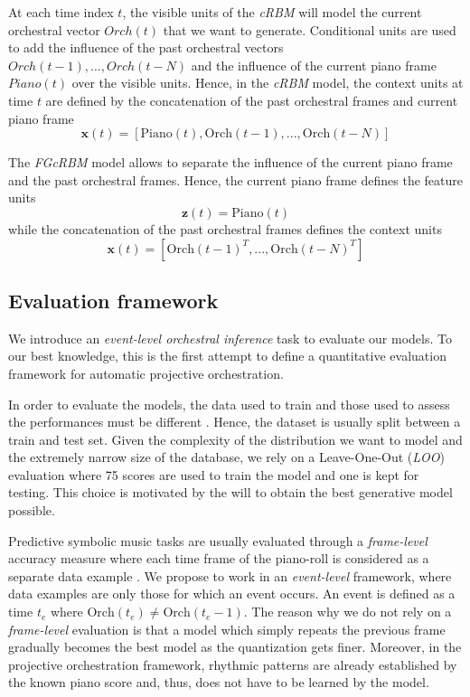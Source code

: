 \documentclass{article}
\begin{document}
At each time index $t$, the visible units of the \textit{cRBM} will model the current orchestral vector $Orch(t)$ that we want to generate. Conditional units are used to add the influence of the past orchestral vectors $Orch(t-1) , ... , Orch(t-N)$ and the influence of the current piano frame $Piano(t)$ over the visible units. Hence, in the \textit{cRBM} model, the context units at time $t$ are defined by the concatenation of the past orchestral frames and current piano frame
\begin{equation}
\bm{x}(t) = \left[ \text{Piano}(t) , \text{Orch}(t-1) , ... , \text{Orch}(t-N)\right]
\end{equation}

The \textit{FGcRBM} model allows to separate the influence of the current piano frame and the past orchestral frames. Hence, the current piano frame defines the feature units
\begin{equation}
\bm{z}(t) = \text{Piano}(t)
\end{equation}
while the concatenation of the past orchestral frames defines the context units
\begin{equation}
\bm{x}(t) = \left[ \text{Orch}(t-1)^{T} , ... , \text{Orch}(t-N)^{T} \right]
\end{equation}

\subsection{Evaluation framework}
We introduce an \textit{event-level orchestral inference} task to evaluate our models. To our best knowledge, this is the first attempt to define a quantitative evaluation framework for automatic projective orchestration.

In order to evaluate the models, the data used to train and those used to assess the performances must be different \cite{bishop2006pattern}. Hence, the dataset is usually split between a train and test set.
Given the complexity of the distribution we want to model and the extremely narrow size of the database, we rely on a Leave-One-Out (\textit{LOO}) evaluation where 75 scores are used to train the model and one is kept for testing. This choice is motivated by the will to obtain the best generative model possible.

Predictive symbolic music tasks are usually evaluated through a \textit{frame-level} accuracy measure where each time frame of the piano-roll is considered as a separate data example \cite{DBLP:journals/corr/YaoCVDD15,boulanger2012modeling,lavrenko2003polyphonic}.
We propose to work in an \textit{event-level} framework, where data examples are only those for which an event occurs. An event is defined as a time $t_{e}$ where $\text{Orch}(t_{e}) \neq \text{Orch}(t_{e} - 1)$. The reason why we do not rely on a \textit{frame-level} evaluation is that a model which simply repeats the previous frame gradually becomes the best model as the quantization gets finer. Moreover, in the projective orchestration framework, rhythmic patterns are already established by the known piano score and, thus, does not have to be learned by the model.
\end{document}

